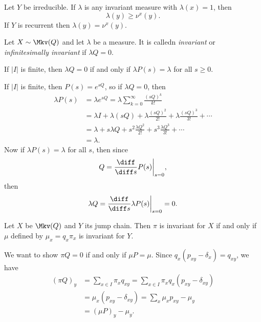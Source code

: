 \documentclass[12pt]{article}
\begin{document}
\begin{theorem} 
	Let $Y$ be irreducible. If $\lambda$ is any invariant measure with $\lambda(x) = 1$, then
	\[
	\lambda(y) \geq \nu^{x}(y)
	.\]
	If $Y$ is recurrent then $\lambda(y) = \nu^{x}(y)$.
\end{theorem}

\begin{definition}
	Let $X \sim \Mkv(Q)$ and let $\lambda$ be a measure. It is calledn \emph{invariant} or \emph{infinitesimally invariant} if $\lambda Q = 0$.
\end{definition}

\begin{lemma}
	If $|I|$ is finite, then $\lambda Q = 0$ if and only if $\lambda P(s) = \lambda$ for all $s \geq 0$.
\end{lemma}

\begin{proofbox}
	If $|I|$ is finite, then $P(s) = e^{sQ}$, so if $\lambda Q = 0$, then
	\begin{align*}
		\lambda P(s) &= \lambda e^{sQ} = \lambda \sum_{k = 0}^{\infty} \frac{(sQ)^{k}}{k!} \\
			     &= \lambda I + \lambda (sQ) + \lambda \frac{(sQ)^2}{2!} + \lambda \frac{(sQ)^3}{3!} + \cdots \\
			     &= \lambda + s \lambda Q + s^2 \frac{\lambda Q^2}{2!} + s^3 \frac{\lambda Q^3}{3!} + \cdots \\
			     &= \lambda.
	\end{align*}
	Now if $\lambda P(s) = \lambda$ for all $s$, then since
	\[
	Q = \frac{\diff}{\diff s} P(s) \biggr|_{s = 0}
	,\]
	then
	\[
	\lambda Q = \frac{\diff}{\diff s} \lambda P(s) \biggr|_{s = 0} = 0
	.\]
\end{proofbox}

\begin{lemma}
	Let $X$ be $\Mkv(Q)$ and $Y$ its jump chain. Then $\pi$ is invariant for $X$ if and only if $\mu$ defined by $\mu_x = q_x \pi_x$ is invariant for $Y$.
\end{lemma}

\begin{proofbox}
	We want to show $\pi Q = 0$ if and only if $\mu P = \mu$. Since $q_x(p_{xy} - \delta_x) = q_{xy}$, we have
	\begin{align*}
		(\pi Q)_y &= \sum_{x \in I} \pi_x q_{xy} = \sum_{x \in I} \pi_x q_x (p_{xy} - \delta_{xy}) \\
			  &= \mu_x(p_{xy} - \delta_{xy}) = \sum_x \mu_x p_{xy} - \mu_y \\
			  &= (\mu P)_y - \mu_y.
	\end{align*}
\end{proofbox}
\end{document}

